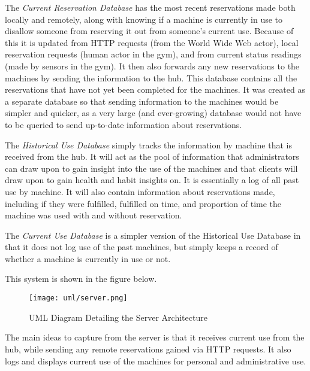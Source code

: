 \documentclass[PPFS.tex]{template/subfiles}
\begin{document}
The \textit{Current Reservation Database} has the most recent reservations made both locally and remotely, along with knowing if a machine is currently in use to disallow someone from reserving it out from someone's current use. Because of this it is updated from HTTP requests (from the World Wide Web actor), local reservation requests (human actor in the gym), and from current status readings (made by sensors in the gym). It then also forwards any new reservations to the machines by sending the information to the hub. This database contains all the reservations that have not yet been completed for the machines. It was created as a separate database so that sending information to the machines would be simpler and quicker, as a very large (and ever-growing) database would not have to be queried to send up-to-date information about reservations.

The \textit{Historical Use Database} simply tracks the information by machine that is received from the hub. It will act as the pool of information that administrators can draw upon to gain insight into the use of the machines and that clients will draw upon to gain health and habit insights on. It is essentially a log of all past use by machine. It will also contain information about reservations made, including if they were fulfilled, fulfilled on time, and proportion of time the machine was used with and without reservation.

The \textit{Current Use Database} is a simpler version of the Historical Use Database in that it does not log use of the past machines, but simply keeps a record of whether a machine is currently in use or not.

This system is shown in the figure below.

\begin{figure}[H]
    \centering
    \texttt{[image: uml/server.png]}
    \caption{UML Diagram Detailing the Server Architecture}
\end{figure}

The main ideas to capture from the server is that it receives current use from the hub, while sending any remote reservations gained via HTTP requests. It also logs and displays current use of the machines for personal and administrative use.
\end{document}
